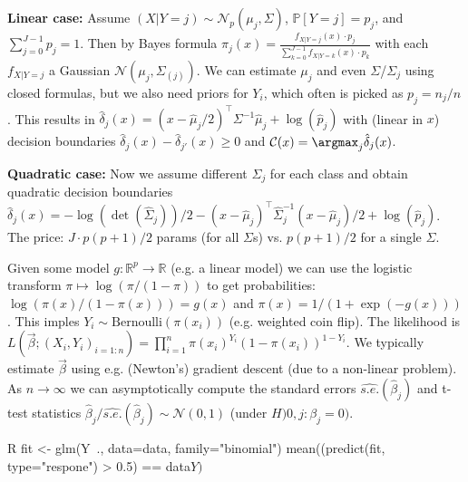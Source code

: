 \begin{sectionbox}\nospacing{}
  \textbf{Linear case: }Assume $(X | Y=j) \sim \mathcal{N}_p(\mu_j, \Sigma)$, $\mathbb{P}[Y=j] = p_j$, and $\sum_{j=0}^{J-1}p_j=1$.
  Then by Bayes formula $\pi_j(x) = \frac{f_{X|Y=j}(x)\cdot p_j}{\sum_{k=0}^{J-1}f_{X|Y=k}(x)\cdot p_k}$ with each $f_{X|Y=j}$ a Gaussian $\mathcal{N}(\mu_j, \Sigma_{(j)})$.
  We can estimate $\mu_j$ and even $\Sigma$/$\Sigma_j$ using closed formulas, but we also need priors for $Y_i$, which often is picked as $p_j=n_j/n$.
  This results in $\hat \delta_j(x) = (x-\hat{\mu}_j/2)^{\top}\Sigma^{-1}\hat{\mu}_j+\log(\hat p_j)$ with (linear in $x$) decision boundaries $\hat{\delta}_j(x) - \hat \delta_{j'}(x) \geq 0$ and $\mathcal{C}(x) = \argmax_j \hat \delta_j(x)$.

  \textbf{Quadratic case: } Now we assume different $\Sigma_j$ for each class and obtain quadratic decision boundaries $\hat{\delta}_j(x) = -\log(\det(\hat\Sigma_j))/2 - (x-\hat{\mu}_j)^{\top}\hat{\Sigma}_j^{-1}(x-\hat{\mu}_j)/2 + \log(\hat p_j)$.
  The price: $J\cdot p(p+1)/2$ params (for all $\Sigma$s) vs. $p(p+1)/2$ for a single $\Sigma$.
\end{sectionbox}

\begin{sectionbox}\nospacing{}
  Given some model $g: \mathbb{R}^p \rightarrow \mathbb{R}$ (e.g. a linear model) we can use the logistic transform $\pi \mapsto \log(\pi/(1-\pi))$ to get probabilities: $\log(\pi(x)/(1-\pi(x))) = g(x)$ and $\pi(x) = 1/(1+\exp{(-g(x))})$.
  This imples $Y_i \sim \text{Bernoulli}(\pi(x_i))$ (e.g. weighted coin flip). The likelihood is $L(\vec{\beta}; (X_i,Y_i)_{i=1:n}) = \prod_{i=1}^n\pi(x_i)^{Y_i}(1-\pi(x_i))^{1-Y_i}$.
  We typically estimate $\vec{\beta}$ using e.g. (Newton's) gradient descent (due to a non-linear problem).
  As $n\to \infty$ we can asymptotically compute the standard errors $\widehat{s.e.}(\hat{\beta}_j)$ and t-test statistics $\hat\beta_j/\widehat{s.e.}(\hat\beta_j) \sim \mathcal{N}(0,1)$ (under $H){0,j}: \beta_j=0)$.
  \begin{mintlinebox}{R}
    fit <- glm(Y~., data=data, family="binomial")
    mean((predict(fit, type="respone") > 0.5) == data$Y)$
  \end{mintlinebox}
\end{sectionbox}

